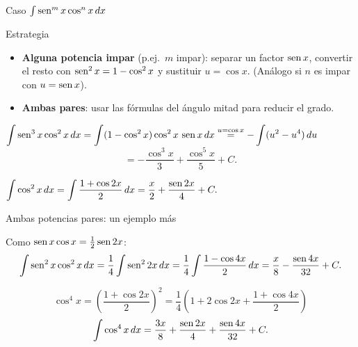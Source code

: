 \documentclass[10pt,aspectratio=169]{beamer}
\begin{document}
\begin{frame}{Caso $\int\operatorname{sen}^m x\cos^n x\,dx$}
  \begin{block}{Estrategia}
    \begin{itemize}
      \item \textbf{Alguna potencia impar} (p.ej.\ $m$ impar): separar un factor $\operatorname{sen} x$, convertir el
        resto con $\operatorname{sen}^2x=1-\cos^2x$ y sustituir $u=\cos x$. (Análogo si $n$ es impar con $u=\operatorname{sen} x$).
      \item \textbf{Ambas pares}: usar las fórmulas del ángulo mitad para reducir el grado.
    \end{itemize}
  \end{block}
  \begin{ejemplo}
    $\displaystyle\int\operatorname{sen}^3x\cos^2x\,dx=\int(1-\cos^2x)\cos^2x\,\operatorname{sen} x\,dx\overset{u=\cos x}{=}-\int(u^2-u^4)\,du$
    \[ =-\frac{\cos^3x}{3}+\frac{\cos^5x}{5}+C. \]
  \end{ejemplo}
  \begin{ejemplo}
    $\displaystyle\int\cos^2x\,dx=\int\frac{1+\cos2x}{2}\,dx=\frac x2+\frac{\operatorname{sen}2x}{4}+C.$
  \end{ejemplo}
\end{frame}

\begin{frame}{Ambas potencias pares: un ejemplo más}
  \begin{ejemplo}
    Como $\operatorname{sen} x\cos x=\tfrac12\operatorname{sen}2x$:
    \[ \int\operatorname{sen}^2x\cos^2x\,dx=\frac14\int\operatorname{sen}^22x\,dx=\frac14\int\frac{1-\cos4x}{2}\,dx
       =\frac{x}{8}-\frac{\operatorname{sen}4x}{32}+C. \]
  \end{ejemplo}
  \begin{ejemplo}
    \[ \cos^4x=\left(\frac{1+\cos2x}{2}\right)^2=\frac14\left(1+2\cos2x+\frac{1+\cos4x}{2}\right) \]
    \[ \int\cos^4x\,dx=\frac{3x}{8}+\frac{\operatorname{sen}2x}{4}+\frac{\operatorname{sen}4x}{32}+C. \]
  \end{ejemplo}
\end{frame}
\end{document}
